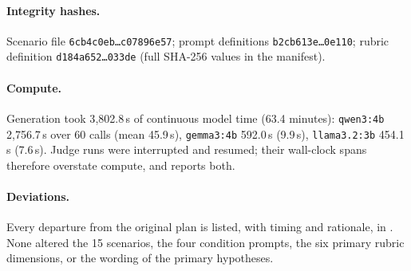 \paragraph{Integrity hashes.} Scenario file
\texttt{6cb4c0eb\ldots c07896e57}; prompt definitions
\texttt{b2cb613e\ldots 0e110}; rubric definition
\texttt{d184a652\ldots 033de} (full SHA-256 values in the manifest).

\paragraph{Compute.} Generation took 3{,}802.8\,s of continuous model time
(63.4 minutes): \texttt{qwen3:4b} 2{,}756.7\,s over 60 calls (mean 45.9\,s),
\texttt{gemma3:4b} 592.0\,s (9.9\,s), \texttt{llama3.2:3b} 454.1\,s (7.6\,s).
Judge runs were interrupted and resumed; their wall-clock spans therefore
overstate compute, and  reports both.

\paragraph{Deviations.} Every departure from the original plan is listed, with
timing and rationale, in . None altered
the 15 scenarios, the four condition prompts, the six primary rubric
dimensions, or the wording of the primary hypotheses.
